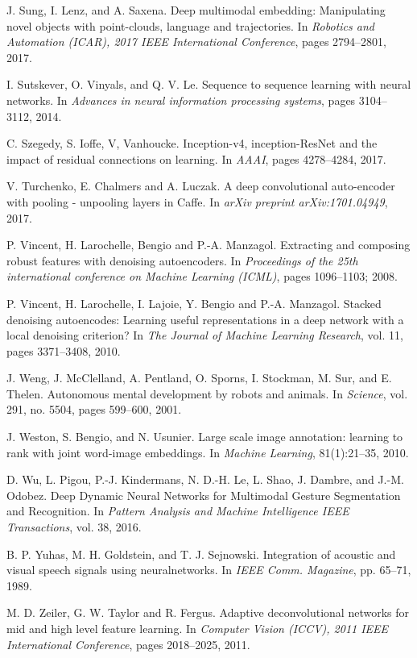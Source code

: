 \begin{thebibliography}{99}
{
  J. Sung, I. Lenz, and A. Saxena. Deep multimodal embedding:
  Manipulating novel objects with point-clouds, language and trajectories.
  In \textit{Robotics and Automation (ICAR), 2017 IEEE International
  Conference}, pages 2794--2801, 2017.

  I. Sutskever, O. Vinyals, and Q. V. Le. Sequence to sequence learning
  with neural networks. In \textit{Advances in neural information
  processing systems}, pages 3104--3112, 2014.

  C. Szegedy, S. Ioffe, V, Vanhoucke. Inception-v4, inception-ResNet and the
  impact of residual connections on learning. In \textit{AAAI},
  pages 4278--4284, 2017.

  V. Turchenko, E. Chalmers and A. Luczak. A deep convolutional auto-encoder
  with pooling - unpooling layers in Caffe. In \textit{arXiv preprint
  arXiv:1701.04949}, 2017.

  P. Vincent, H. Larochelle, Bengio and P.-A. Manzagol.
  Extracting and composing robust features with denoising autoencoders.
  In \textit{Proceedings of the 25th international conference
  on Machine Learning (ICML)}, pages 1096--1103; 2008.

  P. Vincent, H. Larochelle, I. Lajoie, Y. Bengio and P.-A. Manzagol.
  Stacked denoising autoencodes: Learning useful representations in a
  deep network with a local denoising criterion? In \textit{The Journal
  of Machine Learning Research}, vol. 11, pages 3371--3408, 2010.

J. Weng, J. McClelland, A. Pentland, O. Sporns, I. Stockman, M. Sur,
and E. Thelen. Autonomous mental development by robots and animals.
In \textit{Science}, vol. 291, no. 5504, pages 599–600, 2001.

  J. Weston, S. Bengio, and N. Usunier. 
  Large scale image annotation: learning to rank with joint word-image
  embeddings. In \textit{Machine Learning}, 81(1):21--35, 2010.

  D. Wu, L. Pigou, P.-J. Kindermans, N. D.-H. Le, L. Shao,
  J. Dambre, and J.-M. Odobez. 
  Deep Dynamic Neural Networks for Multimodal Gesture Segmentation and
  Recognition. In \textit{Pattern Analysis and Machine Intelligence
  IEEE Transactions}, vol. 38, 2016.

  B. P. Yuhas, M. H. Goldstein, and T. J. Sejnowski. Integration of acoustic
  and visual speech signals using neuralnetworks. In \textit{IEEE Comm.
  Magazine}, pp. 65--71, 1989.

}

  M. D. Zeiler, G. W. Taylor and R. Fergus.
  Adaptive deconvolutional networks for mid and high level feature learning.
  In \textit{Computer Vision (ICCV), 2011 IEEE International Conference},
  pages 2018--2025, 2011.

\end{thebibliography}
